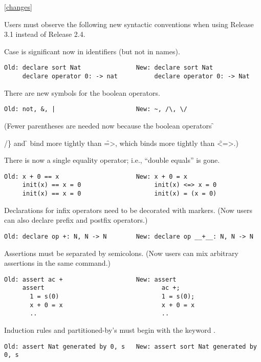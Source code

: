 \ref{changes}

Users must observe the following new syntactic conventions when using Release
3.1 instead of Release 2.4.

\begin{itemize}
\item
Case is significant now in identifiers (but not in names).
\begin{verbatim}
Old: declare sort Nat               New: declare sort Nat
     declare operator 0: -> nat          declare operator 0: -> Nat
\end{verbatim}
\item
There are new symbols for the boolean operators.
\begin{verbatim}
Old: not, &, |                      New: ~, /\, \/
\end{verbatim}
(Fewer parentheses are needed now because the boolean operators \f{/\} and
\f{\/} bind more tightly than \f{=>}, which binds more tightly than \f{<=>}.)
\p
\item
There is now a single equality operator; i.e., ``double equals'' is gone.
\begin{verbatim}
Old: x + 0 == x                     New: x + 0 = x
     init(x) == x = 0                    init(x) <=> x = 0
     init(x) == x = 0                    init(x) = (x = 0)       
\end{verbatim}
\item
Declarations for infix operators need to be decorated with markers.  (Now users
can also declare prefix and postfix operators.)
\begin{verbatim}
Old: declare op +: N, N -> N        New: declare op __+__: N, N -> N
\end{verbatim}
\item
Assertions must be separated by semicolons. (Now users can mix arbitrary
assertions in the same  command.)
\begin{verbatim}
Old: assert ac +                    New: assert 
     assert                                ac +; 
       1 = s(0)                            1 = s(0); 
       x + 0 = x                           x + 0 = x
       ..                                  ..
\end{verbatim}
\item
Induction rules and partitioned-by's must begin with the keyword .
\begin{verbatim}
Old: assert Nat generated by 0, s   New: assert sort Nat generated by 0, s

\end{verbatim}}
\end{itemize}
